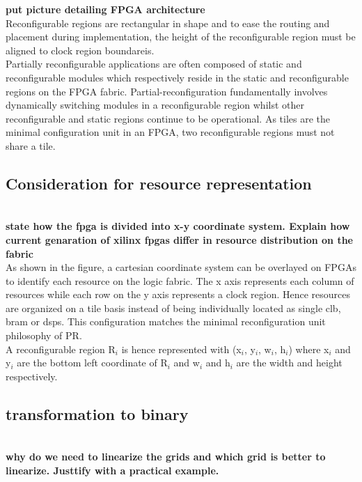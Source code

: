 \textbf{put picture detailing FPGA architecture} \\

Reconfigurable regions are rectangular in shape and to ease the routing and placement during implementation, the height of the reconfigurable region must be aligned to clock region boundareis. \\

Partially reconfigurable applications are often composed of static and reconfigurable modules which respectively reside in the static and reconfigurable regions on the FPGA fabric. Partial-reconfiguration fundamentally involves dynamically switching modules in a reconfigurable region whilst other reconfigurable and static regions continue to be operational. As tiles are the minimal configuration unit in an FPGA, two reconfigurable regions must not share a tile. \\ 
 
\subsection{Consideration for resource representation}
\textbf{\\state how the fpga is divided into x-y coordinate system. Explain how current genaration of xilinx fpgas differ in resource distribution on the fabric} \\

As shown in the figure, a cartesian coordinate system can be overlayed on FPGAs to identify each resource on the logic fabric. The x axis represents each column of resources while each row on the y axis represents a clock region. Hence resources are organized on a tile basis instead of being individually located as single clb, bram or dsps. This configuration matches the minimal reconfiguration unit philosophy of PR. \\

A reconfigurable region R$_i$ is hence represented with (x$_i$, y$_i$, w$_i$, h$_i$) where x$_i$ and y$_i$ are the bottom left coordinate of R$_i$ and w$_i$ and h$_i$ are the width and height respectively. \\

 

\subsection{transformation to binary}
\textbf{\\why do we need to linearize the grids and which grid is better to linearize. Justtify with a practical example.}\\

